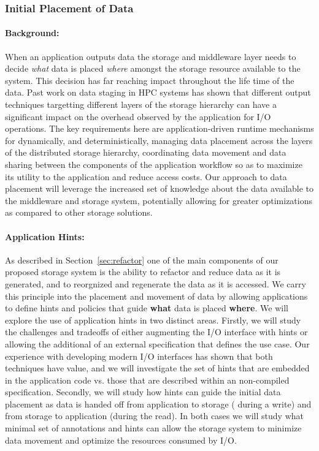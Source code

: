 \subsubsection{Initial Placement of Data}
\label{sec:init-plac-data}

\paragraph{Background:}
When an application outputs data the storage and middleware layer needs to
decide \textit{what} data is placed \textit{where} amongst the storage
resource available to the system. This decision has far reaching impact
throughout the life time of the data. Past work on data
staging\cite{tongipdps15,qiansc15}\cite{docan2012dataspaces}\cite{abbasi2010datastager}
in HPC systems has shown that different output techniques targetting
different layers of the storage hierarchy can have a significant impact on
the overhead observed by the application for I/O operations. The key
requirements here are application-driven runtime mechanisms for dynamically, and
deterministically, 
managing data placement across the layers of the distributed storage
hierarchy, coordinating data movement and data sharing between the
components of the application workflow so as to maximize its utility to the
application and reduce access costs. Our approach to data placement will
leverage the increased set of knowledge about the data available to the
middleware and storage system, potentially allowing for greater
optimizations as compared to other storage solutions.

\paragraph{Application Hints:}
As described in Section~\ref{sec:refactor} one of the main components of our
proposed storage system is the ability to refactor and reduce data as it is
generated, and to reorgnized and regenerate the data as it is accessed. We
carry this principle into the placement and movement of data by allowing
applications to define hints and policies that guide \textbf{what} data is
placed \textbf{where}. We will explore the use of application hints in two
distinct areas. Firstly, we will study the challenges and tradeoffs of either
augmenting the I/O interface with hints or allowing the additional of an
external specification that defines the use case. Our experience with
developing modern I/O interfaces has shown that both techniques have value,
and we will investigate the set of hints that are embedded in the
application code vs. those that are described within an non-compiled
specification. Secondly, we will study how hints can guide the initial data
placement as data is handed off from application to storage ( during a
write) and from storage to application (during the read). In both cases we
will study what minimal set of annotations and hints can allow the storage
system to minimize data movement and optimize the resources consumed by I/O. 


